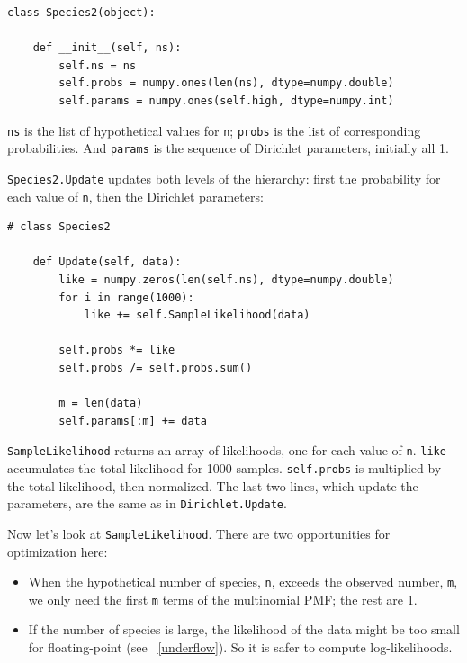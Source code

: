 \documentclass[12pt]{book}
\begin{document}
\begin{verbatim}
class Species2(object):
    
    def __init__(self, ns):
        self.ns = ns
        self.probs = numpy.ones(len(ns), dtype=numpy.double)
        self.params = numpy.ones(self.high, dtype=numpy.int)
\end{verbatim}

{\tt ns} is the list of hypothetical values for {\tt n};
{\tt probs} is the list of corresponding probabilities.  And
{\tt params} is the sequence of Dirichlet parameters, initially
all 1.

{\tt Species2.Update} updates both levels of
the hierarchy: first the probability for each value of {\tt n},
then the Dirichlet parameters:

\begin{verbatim}
# class Species2

    def Update(self, data):
        like = numpy.zeros(len(self.ns), dtype=numpy.double)
        for i in range(1000):
            like += self.SampleLikelihood(data)

        self.probs *= like
        self.probs /= self.probs.sum()

        m = len(data)
        self.params[:m] += data
\end{verbatim}

{\tt SampleLikelihood} returns an array of likelihoods, one for each
value of {\tt n}.  {\tt like} accumulates the total likelihood for
1000 samples.  {\tt self.probs} is multiplied by the total likelihood,
then normalized.  The last two lines, which update the parameters,
are the same as in {\tt Dirichlet.Update}.

Now let's look at {\tt SampleLikelihood}.  There are two
opportunities for optimization here:

\begin{itemize}

\item When the hypothetical number of species, {\tt n},
exceeds the observed number, {\tt m}, we only need the first {\tt m}
terms of the multinomial PMF; the rest are 1.

\item If the number of species is large, the likelihood of the data
  might be too small for floating-point (see ~\ref{underflow}).  So it
  is safer to compute log-likelihoods.
   

\end{itemize}
\end{document}
